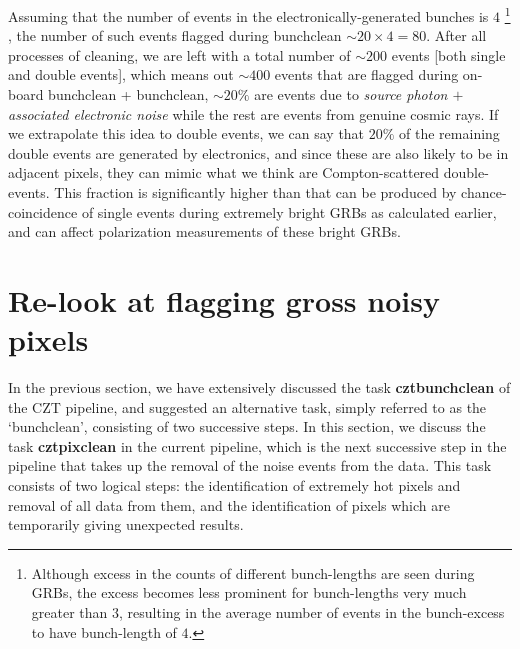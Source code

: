 Assuming that the number of events in the electronically-generated bunches is $4$ \footnote{Although excess in the counts of different bunch-lengths are seen during GRBs, the excess becomes less prominent for bunch-lengths very much greater than $3$, resulting in the average number of events in the bunch-excess to have bunch-length of $4$.} , the number of such events flagged during bunchclean $\sim 20 \times 4 = 80$. After all processes of cleaning, we are left with a total number of $\sim 200$ events [both single and double events], which means out $\sim 400$ events that are flagged during on-board bunchclean + bunchclean, $\sim 20 \%$ are events due to \emph{source photon $+$ associated electronic noise} while the rest are events from genuine cosmic rays. If we extrapolate this idea to double events, we can say that $20 \%$ of the remaining double events are generated by electronics, and since these are also likely to be in adjacent pixels, they can mimic what we think are Compton-scattered double-events. This fraction is significantly higher than that can be produced by chance-coincidence of single events during extremely bright GRBs as calculated earlier, and can affect polarization measurements of these bright GRBs.


\section{Re-look at flagging gross noisy pixels}
\label{sec:Gross_noisy_pixels}

In the previous section, we have extensively discussed the task \textbf{cztbunchclean} of the CZT pipeline, and suggested an alternative task, simply referred to as the `bunchclean', consisting of two successive steps. In this section, we discuss the task \textbf{cztpixclean} in the current pipeline, which is the next successive step in the pipeline that takes up the removal of the noise events from the data. This task consists of two logical steps: the identification of extremely hot pixels and removal of all data from them, and the identification of pixels which are temporarily giving unexpected results.

